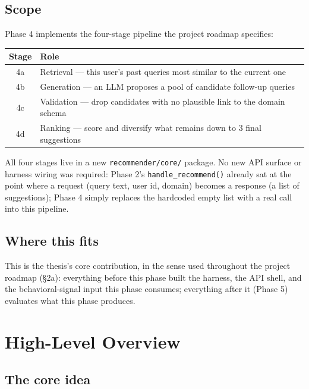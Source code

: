 \documentclass[11pt,a4paper]{article}
\newcommand{\code}[1]{\texttt{#1}}
\begin{document}
\subsection{Scope}

Phase 4 implements the four-stage pipeline the project roadmap specifies:

\begin{center}
\begin{tabular}{cl}
\toprule
\textbf{Stage} & \textbf{Role} \\
\midrule
4a & Retrieval --- this user's past queries most similar to the current one \\
4b & Generation --- an LLM proposes a pool of candidate follow-up queries \\
4c & Validation --- drop candidates with no plausible link to the domain schema \\
4d & Ranking --- score and diversify what remains down to 3 final suggestions \\
\bottomrule
\end{tabular}
\end{center}

All four stages live in a new \code{recommender/core/} package. No new API surface or harness
wiring was required: Phase 2's \code{handle\_recommend()} already sat at the point where a request
(query text, user id, domain) becomes a response (a list of suggestions); Phase 4 simply replaces
the hardcoded empty list with a real call into this pipeline.

\subsection{Where this fits}

This is the thesis's core contribution, in the sense used throughout the project roadmap (\S2a):
everything before this phase built the harness, the API shell, and the behavioral-signal input
this phase consumes; everything after it (Phase 5) evaluates what this phase produces.

\newpage
\section{High-Level Overview}

\subsection{The core idea}
\end{document}
